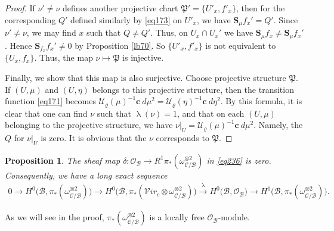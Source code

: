 \documentclass[12pt,b5paper,notitlepage]{report}
\theoremstyle{definition}
\theoremstyle{plain}
\newtheorem{pp}[df]{Proposition}
\newcommand{\fk}{\mathfrak}
\newcommand{\mc}{\mathcal}
\newcommand{\scr}{\mathscr}
\newcommand{\cbf}{\mathbf c}
\newcommand{\svir}{\mathcal V\!\mathit{ir}}
\newcommand{\Sbf}{\mathbf{S}}
\numberwithin{equation}{section}
\begin{document}
\begin{proof}
If $\nu'\neq \nu$ defines another projective chart $\fk P'=\{U'_x,f'_x\}$, then for the corresponding $Q'$ defined similarly by \eqref{eq173} on $U'_x$, we have $\Sbf_\mu f_x'=Q'$. Since $\nu'\neq \nu$, we may find $x$ such that $Q\neq Q'$. Thus, on $U_x\cap U_x'$ we have $\Sbf_\mu f_x\neq \Sbf_\mu f_x'$. Hence $\Sbf_{f_x} f_x'\neq 0$ by Proposition \ref{lb70}. So $\{U'_x,f'_x\}$ is not equivalent to $\{U_x,f_x\}$. Thus, the map $\nu\mapsto\fk P$ is injective. 

Finally, we show that this map is also surjective. Choose projective structure  $\fk P$. If $(U,\mu)$ and $(U,\eta)$ belongs to this projective structure, then the transition function \eqref{eq171} becomes $\mc U_\varrho(\mu)^{-1}\cbf~d\mu^2=\mc U_\varrho(\eta)^{-1}\cbf~d\eta^2$. By this formula, it is clear that one can find $\nu$ such that $\uplambda(\nu)=1$, and that on each $(U,\mu)$ belonging to the projective structure, we have $\nu|_U=\mc U_\varrho(\mu)^{-1}\cbf ~d\mu^2$. Namely, the $Q$ for $\nu|_U$ is zero. It is obvious that the $\nu$ corresponds to $\fk P$.
\end{proof}


\begin{pp}
The sheaf map $\delta:\scr O_{\mc B}\rightarrow R^1\pi_*(\omega_{\mc C/\mc B}^{\otimes 2})$ in \eqref{eq236} is zero. Consequently, we have a long exact sequence
\begin{align}
0\rightarrow H^0\big(\mc B,\pi_*(\omega_{\mc C/\mc B}^{\otimes 2})\big)\rightarrow H^0\big(\mc B,\pi_*(\svir_c\otimes \omega_{\mc C/\mc B}^{\otimes 2})\big)\xrightarrow{\uplambda} H^0\big(\mc B,\scr O_{\mc B}\big)\rightarrow H^1\big(\mc B,\pi_*(\omega_{\mc C/\mc B}^{\otimes 2})\big).\label{eq175}
\end{align}
\end{pp}

As we will see in the proof, $\pi_*(\omega_{\mc C/\mc B}^{\otimes 2})$ is a locally free $\scr O_{\mc B}$-module.
\end{document}
